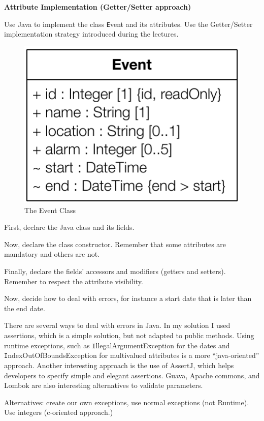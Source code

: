 \documentclass[a4paper,11pt]{memoir}
\newcommand{\code}[1]{{\texttt #1}}
\begin{document}
\begin{exercise}
	\textbf{Attribute Implementation (Getter/Setter approach)} 
	
Use Java to implement the class \code{Event} and its attributes. 
Use the Getter/Setter implementation strategy introduced during the lectures.  


\begin{figure}[htbp]
	\centering
		\includegraphics[width=.4\linewidth]{CD-Event.pdf}
	\caption{The Event Class}
	\label{fig:event}
\end{figure}	

\begin{inparaenum}[(A)]
	\item First, declare the Java class and its fields.
	\item Now, declare the class constructor. Remember that some attributes are mandatory and others are not.
	\item Finally, declare the fields' accessors and modifiers (getters and setters). Remember to respect the attribute visibility.
	\item Now, decide how to deal with errors, for instance a start date that is later than the end date. 
\end{inparaenum}
\end{exercise}

\begin{solution}
			There are several ways to deal with errors in Java. In my solution I used assertions, which is a simple solution, but not adapted to public methods. Using runtime exceptions, such as \code{IllegalArgumentException} for the dates and \code{IndexOutOfBoundsException} for multivalued attributes is a more ``java-oriented'' approach. Another interesting approach is the use of AssertJ, which helps developers to specify simple and elegant assertions. Guava, Apache commons, and Lombok are also interesting alternatives to validate parameters.
			
			Alternatives: create our own exceptions, use normal exceptions (not Runtime). Use integers (c-oriented approach.)



\end{solution}
	
\end{document}
